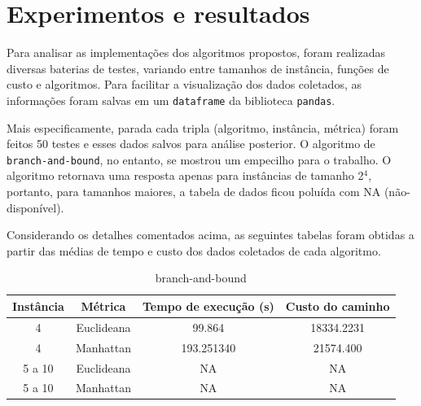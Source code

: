 \documentclass{article}
\begin{document}
\section{Experimentos e resultados}

Para analisar as implementações dos algoritmos propostos, foram realizadas diversas baterias de testes, variando entre tamanhos de instância, funções de custo e algoritmos. Para facilitar a visualização dos dados coletados, as informações foram salvas em um \texttt{dataframe} da biblioteca \texttt{pandas}.

Mais especificamente, parada cada tripla (algoritmo, instância, métrica) foram feitos 50 testes e esses dados salvos para análise posterior. O algoritmo de \texttt{branch-and-bound}, no entanto, se mostrou um empecilho para o trabalho. O algoritmo retornava uma resposta apenas para instâncias de tamanho 2$^4$, portanto, para tamanhos maiores, a tabela de dados ficou poluída com NA (não-disponível).

Considerando os detalhes comentados acima, as seguintes tabelas foram obtidas a partir das médias de tempo e custo dos dados coletados de cada algoritmo.

\begin{table}[H]
\centering
\caption{branch-and-bound}
\vspace{0.5cm}
\begin{tabular}{cccc}

Instância & Métrica & Tempo de execu{\c c}{\~a}o (s) & Custo do caminho \\

\hline                          
4 & Euclideana & 99.864 & 18334.2231 \\
4 & Manhattan & 193.251340 & 21574.400 \\
5 a 10 & Euclideana & NA & NA \\
5 a 10 & Manhattan & NA & NA \\

\end{tabular}
\end{table}
\end{document}
